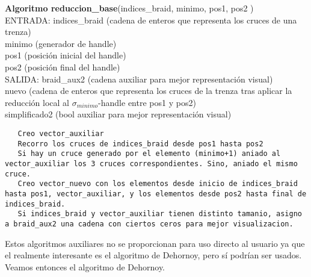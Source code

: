 \begin{alg}
	\textbf{Algoritmo reduccion\_base}(indices\_braid, minimo, pos1, pos2 )\\
	ENTRADA: indices\_braid (cadena de enteros que representa los cruces de una trenza)\\
	\hspace*{2.2cm} minimo (generador de handle) \\
	\hspace*{2.2cm} pos1 (posición inicial del handle) \\
	\hspace*{2.2cm} pos2 (posición final del handle)\\
	SALIDA: \hspace{0.4cm} braid\_aux2 (cadena auxiliar para mejor representación visual) \\
	\hspace*{2.2cm} nuevo (cadena de enteros que representa los cruces de la trenza tras aplicar la reducción local al $\sigma_{minimo}$-handle entre pos1 y pos2)\\
	\hspace*{2.2cm} simplificado2 (bool auxiliar para mejor representación visual)
	
\begin{lstlisting}
   Creo vector_auxiliar
   Recorro los cruces de indices_braid desde pos1 hasta pos2
   Si hay un cruce generado por el elemento (minimo+1) aniado al vector_auxiliar los 3 cruces correspondientes. Sino, aniado el mismo cruce. 
   Creo vector_nuevo con los elementos desde inicio de indices_braid hasta pos1, vector_auxiliar, y los elementos desde pos2 hasta final de indices_braid.
   Si indices_braid y vector_auxiliar tienen distinto tamanio, asigno a braid_aux2 una cadena con ciertos ceros para mejor visualizacion.
\end{lstlisting}
\end{alg}

\newpage
Estos algoritmos auxiliares no se proporcionan para uso directo al usuario ya que el realmente interesante es el algoritmo de Dehornoy, pero sí podrían ser usados. Veamos entonces el algoritmo de Dehornoy.\\

